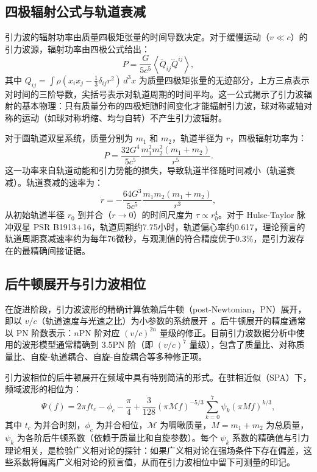 \subsection{四极辐射公式与轨道衰减}

引力波的辐射功率由质量四极矩张量的时间导数决定。对于缓慢运动（$v \ll c$）的引力波源，辐射功率由四极公式给出：
\begin{equation}
  P = \frac{G}{5c^5} \left\langle \dddot{Q}_{ij} \dddot{Q}^{ij} \right\rangle,
\end{equation}
其中 $Q_{ij} = \int \rho(x_i x_j - \frac{1}{3}\delta_{ij}r^2)\,d^3x$ 为质量四极矩张量的无迹部分，上方三点表示对时间的三阶导数，尖括号表示对轨道周期的时间平均。这一公式揭示了引力波辐射的基本物理：只有质量分布的四极矩随时间变化才能辐射引力波，球对称或轴对称的运动（如球对称坍缩、均匀自转）不产生引力波辐射。

对于圆轨道双星系统，质量分别为 $m_1$ 和 $m_2$，轨道半径为 $r$，四极辐射功率为：
\begin{equation}
  P = \frac{32G^4}{5c^5} \frac{m_1^2 m_2^2 (m_1 + m_2)}{r^5}.
\end{equation}
这一功率来自轨道动能和引力势能的损失，导致轨道半径随时间减小（轨道衰减）。轨道衰减的速率为：
\begin{equation}
  \dot{r} = -\frac{64G^3}{5c^5} \frac{m_1 m_2 (m_1 + m_2)}{r^3},
\end{equation}
从初始轨道半径 $r_0$ 到并合（$r \to 0$）的时间尺度为 $\tau \propto r_0^4$。对于 Hulse-Taylor 脉冲双星 PSR B1913+16，轨道周期约7.75小时，轨道偏心率约0.617，理论预言的轨道周期衰减速率约为每年76微秒，与观测值的符合精度优于0.3\%，是引力波存在的最精确间接证据。

\subsection{后牛顿展开与引力波相位}

在旋进阶段，引力波波形的精确计算依赖后牛顿（post-Newtonian，PN）展开，即以 $v/c$（轨道速度与光速之比）为小参数的系统展开~\cite{Blanchet2014PN}。后牛顿展开的精度通常以 PN 阶数表示：$n$PN 阶对应 $(v/c)^{2n}$ 量级的修正。目前引力波数据分析中使用的波形模型通常精确到 3.5PN 阶（即 $(v/c)^7$ 量级），包含了质量比、对称质量比、自旋-轨道耦合、自旋-自旋耦合等多种修正项。

引力波相位的后牛顿展开在频域中具有特别简洁的形式。在驻相近似（SPA）下，频域波形的相位为：
\begin{equation}
  \Psi(f) = 2\pi f t_c - \phi_c - \frac{\pi}{4} + \frac{3}{128}(\pi \mathcal{M} f)^{-5/3} \sum_{k=0}^{7} \psi_k \left(\pi M f\right)^{k/3},
\end{equation}
其中 $t_c$ 为并合时刻，$\phi_c$ 为并合相位，$\mathcal{M}$ 为啁啾质量，$M = m_1 + m_2$ 为总质量，$\psi_k$ 为各阶后牛顿系数（依赖于质量比和自旋参数）。每个 $\psi_k$ 系数的精确值与引力理论相关，是检验广义相对论的探针：如果广义相对论在强场条件下存在偏差，这些系数将偏离广义相对论的预言值，从而在引力波相位中留下可测量的印记。

